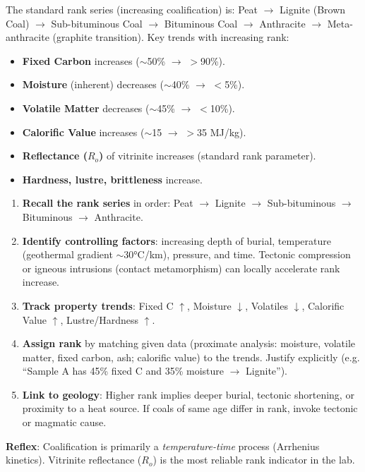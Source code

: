 \documentclass[11pt]{article}
\newcommand{\cle}[1]{{\popxbold\color{popdark}#1}}
\begin{document}
\begin{propriete}
The standard rank series (increasing coalification) is:
\cle{Peat} $\rightarrow$ \cle{Lignite} (Brown Coal) $\rightarrow$ \cle{Sub-bituminous Coal} $\rightarrow$ \cle{Bituminous Coal} $\rightarrow$ \cle{Anthracite} $\rightarrow$ \cle{Meta-anthracite} (graphite transition).
Key trends with increasing rank:
\begin{itemize}
\item \textbf{Fixed Carbon} increases ($\sim$50\% $\rightarrow$ $>$90\%).
\item \textbf{Moisture} (inherent) decreases ($\sim$40\% $\rightarrow$ $<$5\%).
\item \textbf{Volatile Matter} decreases ($\sim$45\% $\rightarrow$ $<$10\%).
\item \textbf{Calorific Value} increases ($\sim$15 $\rightarrow$ $>$35 MJ/kg).
\item \textbf{Reflectance ($R_o$)} of vitrinite increases (standard rank parameter).
\item \textbf{Hardness, lustre, brittleness} increase.
\end{itemize}
\end{propriete}

\begin{methode}
\begin{enumerate}
\item \textbf{Recall the rank series} in order: Peat $\rightarrow$ Lignite $\rightarrow$ Sub-bituminous $\rightarrow$ Bituminous $\rightarrow$ Anthracite.
\item \textbf{Identify controlling factors}: increasing depth of burial, temperature (geothermal gradient $\sim$30°C/km), pressure, and time. Tectonic compression or igneous intrusions (contact metamorphism) can locally accelerate rank increase.
\item \textbf{Track property trends}: Fixed C $\uparrow$, Moisture $\downarrow$, Volatiles $\downarrow$, Calorific Value $\uparrow$, Lustre/Hardness $\uparrow$.
\item \textbf{Assign rank} by matching given data (proximate analysis: moisture, volatile matter, fixed carbon, ash; calorific value) to the trends. Justify explicitly (e.g. ``Sample A has 45\% fixed C and 35\% moisture $\rightarrow$ Lignite'').
\item \textbf{Link to geology}: Higher rank implies deeper burial, tectonic shortening, or proximity to a heat source. If coals of same age differ in rank, invoke tectonic or magmatic cause.
\end{enumerate}
\textbf{Reflex}: Coalification is primarily a \emph{temperature-time} process (Arrhenius kinetics). Vitrinite reflectance ($R_o$) is the most reliable rank indicator in the lab.
\end{methode}
\end{document}
